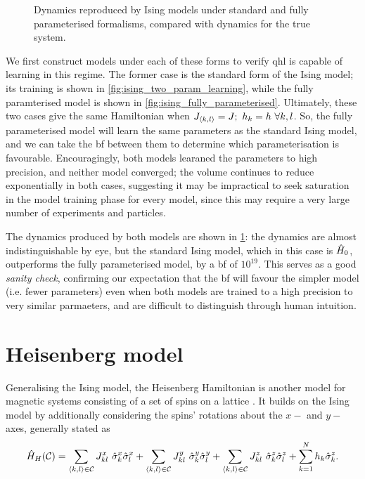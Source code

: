 \begin{figure}
    \begin{center}
    \end{center}
    \caption[Ising model types' dynamics]{
        Dynamics reproduced by Ising models under standard and fully parameterised formalisms, 
        compared with dynamics for the true system.
        \figtableref
    }
    \label{fig:ising_model_types_dynamics}
\end{figure}


We first construct models under each of these forms to verify \gls{qhl} is capable of learning in this regime. 
The former case is the standard form of the Ising model; its training is shown in \cref{fig:ising_two_param_learning}, 
    while the fully paramterised model is shown in \cref{fig:ising_fully_parameterised}. 
Ultimately, these two cases give the same Hamiltonian when $J_{{ \langle k, l \rangle }} = J; \ h_k = h \ \forall k,l$.
So, the fully parameterised model will learn the same parameters as the standard Ising model,
    and we can take the \gls{bf} between them to determine which parameterisation is favourable.
Encouragingly, both models learaned the parameters to high precision, and neither model converged; 
    the \gls{volume} continues to reduce exponentially in both cases, 
    suggesting it may be impractical to seek saturation in the model training phase for every model, 
    since this may require a very large number of experiments and particles. 
\par 

The dynamics produced by both models are shown in \cref{fig:ising_model_types_dynamics}:
    the dynamics are almost indistinguishable by eye, but the standard Ising model, 
    which in this case is $\hat{H}_0$, outperforms the fully parameterised model, 
    by a \gls{bf} of $10^{19}$.
This serves as a good \emph{sanity check}, confirming our expectation that 
    the \gls{bf} will favour the simpler model (i.e. fewer parameters) even when both models 
    are trained to a high precision to very similar parmaeters, and are difficult to distinguish through human intuition. 


\section{Heisenberg model}\label{sec:heisenberg}
Generalising the Ising model, the Heisenberg Hamiltonian is another model for magnetic systems consisting of a set of 
    spins on a lattice \cite{greiner2012thermodynamics}. 
It builds on the Ising model by additionally considering the spins' rotations about the $x-$ and $y-$ axes, generally stated as 
\begin{equation}
    \label{eqn:heisenberg_model_general}
    \hat{H}_H({ \mathcal{C}}) = 
    \sum\limits_{{ \langle k, l \rangle } \in { \mathcal{C}}} J^x_{kl} \  \hat{\sigma}^x_k \hat{\sigma}^x_l
    + \sum\limits_{{ \langle k, l \rangle } \in { \mathcal{C}}} J^y_{kl} \ \hat{\sigma}^y_k \hat{\sigma}^y_l
    + \sum\limits_{{ \langle k, l \rangle } \in { \mathcal{C}}} J^z_{kl} \ \hat{\sigma}^z_k \hat{\sigma}^z_l
    + \sum\limits_{k=1}^{N} h_k \hat{\sigma}^z_k.
\end{equation}

